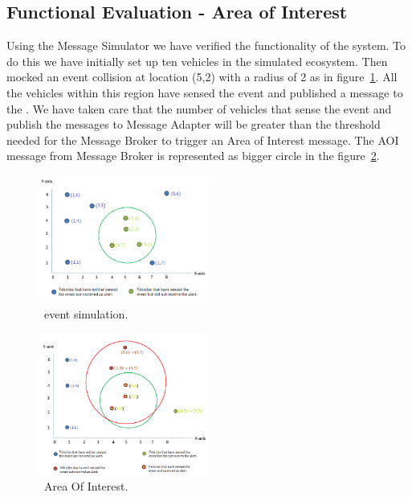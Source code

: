 \subsection{Functional Evaluation - Area of Interest}
Using the Message Simulator we have verified the functionality of the
system.  To do this we have initially set up ten vehicles in the
simulated ecosystem.  Then mocked an event collision at location (5,2)
with a radius of 2 as in figure~\ref{fig:simulated}. All the vehicles
within this region have sensed the event and published a message to
the \name. We have taken care that the number of vehicles that sense
the event and publish the messages to Message Adapter will be greater
than the threshold needed for the Message Broker to trigger an Area of
Interest message. The AOI message from Message Broker is represented
as bigger circle in the figure~\ref{fig:aoi}.

\begin{figure}[ht]
  \begin{center}
    \includegraphics[width=0.5\textwidth]{figs/simulated.png}
    \caption{\name~event simulation.}
    \label{fig:simulated}
  \end{center}
\end{figure}

\begin{figure}[ht]
  \begin{center}
    \includegraphics[width=0.5\textwidth]{figs/aoi.png}
    \caption{\name~Area Of Interest.}
    \label{fig:aoi}
  \end{center}
\end{figure}

